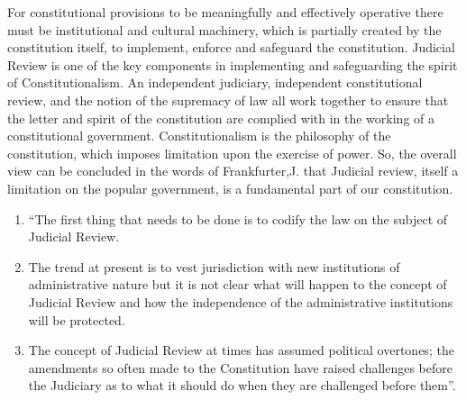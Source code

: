 \begin{multicols}{2}
\vspace{-.1cm}

\noi
For constitutional provisions to be meaningfully and effectively operative there must be
institutional and cultural machinery, which is partially created by the constitution itself, to
implement, enforce and safeguard the constitution. Judicial Review is one of the key
components in implementing and safeguarding the spirit of Constitutionalism. An
independent judiciary, independent constitutional review, and the notion of the supremacy of
law all work together to ensure that the letter and spirit of the constitution are complied with
in the working of a constitutional government. Constitutionalism is the philosophy of the
constitution, which imposes limitation upon the exercise of power. So, the overall view can
be concluded in the words of Frankfurter,J. that Judicial review, itself a limitation on the
popular government, is a fundamental part of our constitution.



\vspace{-.2cm}

\noi
\begin{enumerate}
\itemsep=0pt

\item “The first thing that needs to be done is to codify the law on the subject of Judicial
Review.

\item The trend at present is to vest jurisdiction with new institutions of administrative
nature but it is not clear what will happen to the concept of Judicial Review and how
the independence of the administrative institutions will be protected.

\item The concept of Judicial Review at times has assumed political overtones; the
amendments so often made to the Constitution have raised challenges before the
Judiciary as to what it should do when they are challenged before them”.
\end{enumerate}

\end{multicols}
